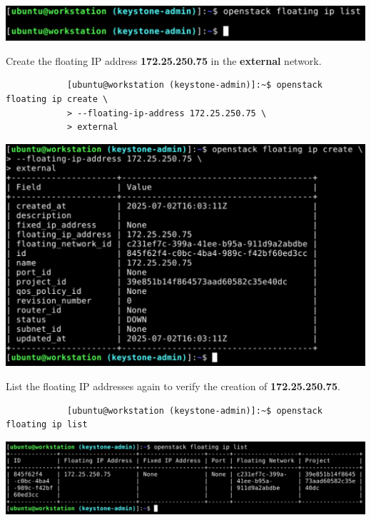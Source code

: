 \documentclass[letterpaper, 12pt]{article}
\begin{document}
\begin{enumerate}
\begin{labstep}
        \begin{center}
            \includegraphics[width=\linewidth]{images/part9/step19.png}
        \end{center}
    \end{labstep}

    \begin{labstep}
        Create the floating IP address \textbf{172.25.250.75} in the \textbf{external} network.
        \begin{lstlisting}
            [ubuntu@workstation (keystone-admin)]:~$ openstack floating ip create \
            > --floating-ip-address 172.25.250.75 \
            > external
        \end{lstlisting}

        \begin{center}
            \includegraphics[width=\linewidth]{images/part9/step20.png}
        \end{center}
    \end{labstep}

    \begin{labstep}
        List the floating IP addresses again to verify the creation of \textbf{172.25.250.75}.
        \begin{lstlisting}
            [ubuntu@workstation (keystone-admin)]:~$ openstack floating ip list
        \end{lstlisting}

        \begin{center}
            \includegraphics[width=\linewidth]{images/part9/step21.png}
        \end{center}
    \end{labstep}


\end{enumerate}
\end{document}
